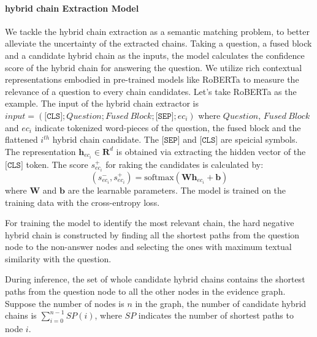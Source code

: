\documentclass[11pt]{article}
\newcommand{\softmax}{\mathrm{softmax}}
\begin{document}
	\paragraph{hybrid chain Extraction Model}
	We tackle the hybrid chain extraction as a semantic matching problem, to better alleviate the uncertainty of the extracted chains. Taking a question, a fused block and a candidate hybrid chain as the inputs, the model calculates the confidence score of the hybrid chain for answering the question. 
	We utilize rich contextual representations embodied in pre-trained models like RoBERTa to measure the relevance of a question to every chain candidates. 
	Let's take RoBERTa as the example. The input of the hybrid chain extractor is $input = (\texttt{[CLS]}; Question; Fused\ Block; \texttt{[SEP]}; ec_i)$
	where $Question$, $Fused\ Block$ and $ec_i$ indicate tokenized word-pieces of the question, the fused block and the flattened $i^{th}$ hybrid chain candidate. The $\texttt{[SEP]}$ and $\texttt{[CLS]}$ are speicial symbols. The representation $\bm{h}_{ec_i}\in\mathbf{R}^d$ is obtained via extracting the hidden vector of the $\texttt{[CLS]}$ token. 
	The score $s^{+}_{ec_i}$ for raking the candidates is calculated by:
	\begin{equation}
		(s^{-}_{ec_i},s^{+}_{ec_i}) = \softmax(\bm{W}\bm{h}_{ec_i}+\bm{b})
	\end{equation}
	where $\bm{W}$ and $\bm{b}$ are the learnable parameters.
The model is trained on the training data with the cross-entropy loss.
	
For training the model to identify the most relevant chain, the hard negative hybrid chain is constructed by finding all the shortest paths from the question node to the non-answer nodes and selecting the ones with maximum textual similarity with the question.
	
	During inference, the set of whole candidate hybrid chains contains the shortest paths from the question node to all the other nodes in the evidence graph. 
	Suppose the number of nodes is $n$ in the graph, the number of candidate hybrid chains is $\sum^{n-1}_{i=0}SP(i)$, where $SP$ indicates the number of shortest paths to node $i$.
	\fi
	
\end{document}
